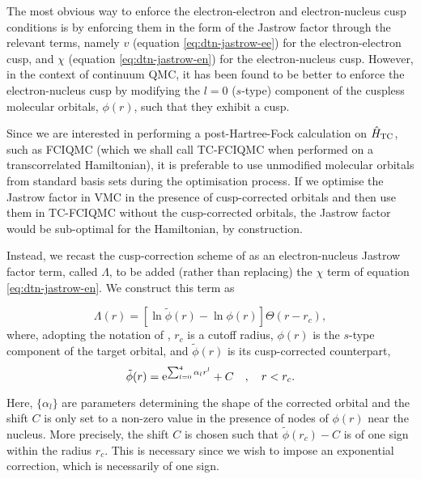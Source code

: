 The most obvious way to enforce the electron-electron and electron-nucleus cusp conditions is by enforcing them in the form of the Jastrow factor through the relevant terms, namely $v$ (equation \ref{eq:dtn-jastrow-ee}) for the electron-electron cusp, and $\chi$ (equation \ref{eq:dtn-jastrow-en}) for the electron-nucleus cusp. However, in the context of continuum \gls{QMC}, it has been found to be better\supercite{drummondJastrow,needsVariational2020,maScheme2005} to enforce the electron-nucleus cusp by modifying the $l=0$ ($s$-type) component of the cuspless molecular orbitals, $\phi(r)$, such that they exhibit a cusp.

Since we are interested in performing a post-Hartree-Fock calculation on $\hat H_\mathrm{TC}$, such as \gls{FCIQMC} (which we shall call \gls{TC}-\gls{FCIQMC} when performed on a transcorrelated Hamiltonian), it is preferable to use unmodified molecular orbitals from standard basis sets during the optimisation process. If we optimise the Jastrow factor in \gls{VMC} in the presence of cusp-corrected orbitals and then use them in TC-FCIQMC without the cusp-corrected orbitals, the Jastrow factor would be sub-optimal for the Hamiltonian, by construction.

Instead, we recast the cusp-correction scheme of  as an electron-nucleus Jastrow factor term, called $\Lambda$, to be added (rather than replacing) the $\chi$ term of equation \ref{eq:dtn-jastrow-en}. We construct this term as

\begin{equation}
    \label{eq:cusp-corr-1}
    \Lambda(r)  = \left[ \ln \tilde \phi(r) - \ln \phi(r) \right]\Theta(r-r_{c}),
\end{equation}
where, adopting the notation of , $r_c$ is a cutoff radius, $\phi(r)$ is the $s$-type component of the target orbital, and $\tilde \phi(r)$ is its cusp-corrected counterpart,
\begin{equation}
    \label{eq:cusp-corr-2}
  \tilde \phi(r) = \mathrm{e}^{\sum_{l=0}^4 \alpha_l r^l} + C \quad,\quad r<r_{c}.
\end{equation}

Here, $\{\alpha_l\}$ are parameters determining the shape of the
corrected orbital and the shift $C$ is only set to a non-zero value in
the presence of nodes of $\phi(r)$ near the nucleus. More precisely, the shift $C$ is chosen such that $\tilde\phi(r_c)-C$ is of one sign within the radius $r_c$. This is necessary since we wish to impose an exponential correction, which is necessarily of one sign.

